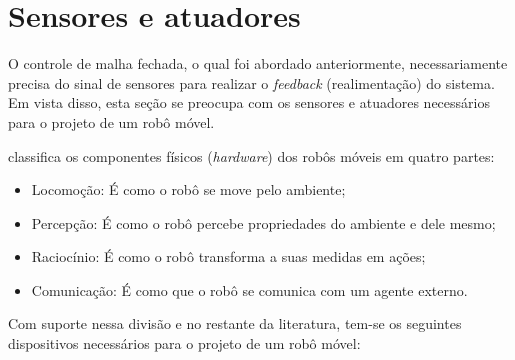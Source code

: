 \section{Sensores e atuadores} \label{cap:sensores}



O controle de malha fechada, o qual foi abordado anteriormente, necessariamente precisa do sinal de sensores para realizar o 
\textit{feedback} (realimentação) do sistema. 
Em vista disso, esta seção se preocupa com os sensores e atuadores necessários para o projeto de um robô móvel.\par

 classifica os componentes físicos (\textit{hardware}) dos robôs móveis em quatro partes:

\begin{itemize}
 \item Locomoção: É como o robô se move pelo ambiente; 
 
 \item Percepção: É como o robô percebe propriedades do ambiente e dele mesmo;
 
 \item Raciocínio: É como o robô transforma a suas medidas em ações;
 
 \item Comunicação: É como que o robô se comunica com um agente externo.
 
\end{itemize}

Com suporte nessa divisão e no restante da literatura, tem-se os seguintes dispositivos necessários para o projeto de um robô móvel:

